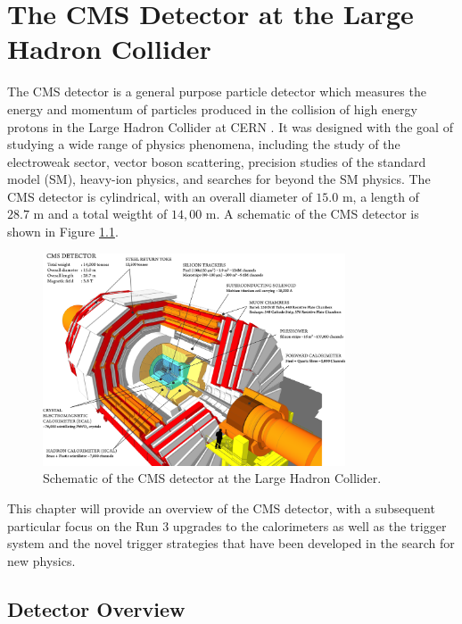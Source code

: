 \chapter{The CMS Detector at the Large Hadron Collider}

The CMS detector is a general purpose particle detector which measures the energy and momentum of particles produced in the collision of high energy protons in the Large Hadron Collider at CERN \cite{collaborationCMSExperimentCERN2008}. It was designed with the goal of studying a wide range of physics phenomena, including the study of the electroweak sector, vector boson scattering, precision studies of the standard model (SM), heavy-ion physics, and searches for beyond the SM physics. The CMS detector is cylindrical, with an overall diameter of $15.0 \text{ m}$, a length of $28.7 \text{ m}$ and a total weigtht of $14,00\text{ m}$. A schematic of the CMS detector is shown in Figure \ref{fig:cms_detector}.

\begin{figure}[ht]
	\centering
	\includegraphics[width=0.8\textwidth]{images/cms_detector.png}
	\caption{Schematic of the CMS detector at the Large Hadron Collider.}
	\label{fig:cms_detector}
\end{figure}

This chapter will provide an overview of the CMS detector, with a subsequent particular focus on the Run 3 upgrades to the calorimeters as well as the trigger system and the novel trigger strategies that have been developed in the search for new physics.

\section{Detector Overview}


